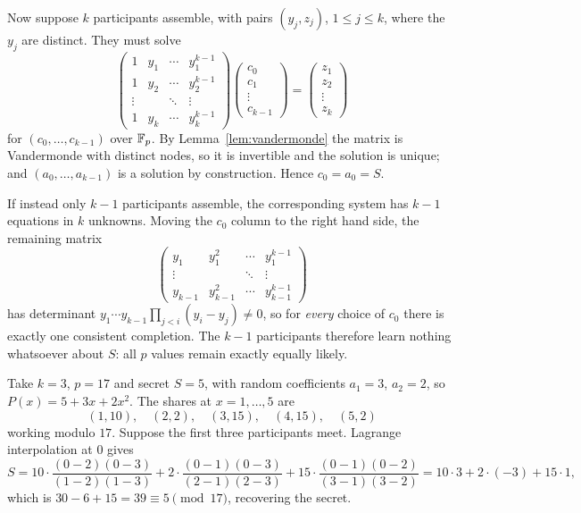 \documentclass[a4paper]{scrartcl}
\begin{document}
Now suppose $k$ participants assemble, with pairs $(y_j, z_j)$, $1 \le j\le k$, where the $y_j$ are distinct. They must solve
$$\begin{pmatrix}
	1 & y_1 & \cdots & y_1^{k-1}\\
	1 & y_2 & \cdots & y_2^{k-1}\\
	\vdots & & \ddots & \vdots\\
	1 & y_k & \cdots & y_k^{k-1}
\end{pmatrix}\begin{pmatrix}c_0\\c_1\\\vdots\\c_{k-1}\end{pmatrix} = \begin{pmatrix}z_1\\z_2\\\vdots\\z_k\end{pmatrix}$$
for $(c_0,\dots,c_{k-1})$ over $\mathbb{F}_p$. By Lemma~\ref{lem:vandermonde} the matrix is Vandermonde with distinct nodes, so it is invertible and the solution is unique; and $(a_0,\dots,a_{k-1})$ is a solution by construction. Hence $c_0 = a_0 = S$.

If instead only $k-1$ participants assemble, the corresponding system has $k-1$ equations in $k$ unknowns. Moving the $c_0$ column to the right hand side, the remaining matrix
$$\begin{pmatrix}
	y_1 & y_1^2 & \cdots & y_1^{k-1}\\
	\vdots & & \ddots & \vdots\\
	y_{k-1} & y_{k-1}^2 & \cdots & y_{k-1}^{k-1}
\end{pmatrix}$$
has determinant $y_1\cdots y_{k-1}\prod_{j<i}(y_i-y_j) \ne 0$, so for \emph{every} choice of $c_0$ there is exactly one consistent completion. The $k-1$ participants therefore learn nothing whatsoever about $S$: all $p$ values remain exactly equally likely.

\begin{example}
	Take $k = 3$, $p = 17$ and secret $S = 5$, with random coefficients $a_1 = 3$, $a_2 = 2$, so $P(x) = 5+3x+2x^2$. The shares at $x = 1,\dots,5$ are
	$$(1,10),\quad (2,2),\quad (3,15),\quad (4,15),\quad(5,2)$$
	working modulo $17$. Suppose the first three participants meet. Lagrange interpolation at $0$ gives
	$$S = 10\cdot\frac{(0-2)(0-3)}{(1-2)(1-3)} + 2\cdot\frac{(0-1)(0-3)}{(2-1)(2-3)} + 15\cdot\frac{(0-1)(0-2)}{(3-1)(3-2)} = 10\cdot3 + 2\cdot(-3)+15\cdot1,$$
	which is $30-6+15 = 39 \equiv 5 \pmod{17}$, recovering the secret.
\end{example}
\end{document}
